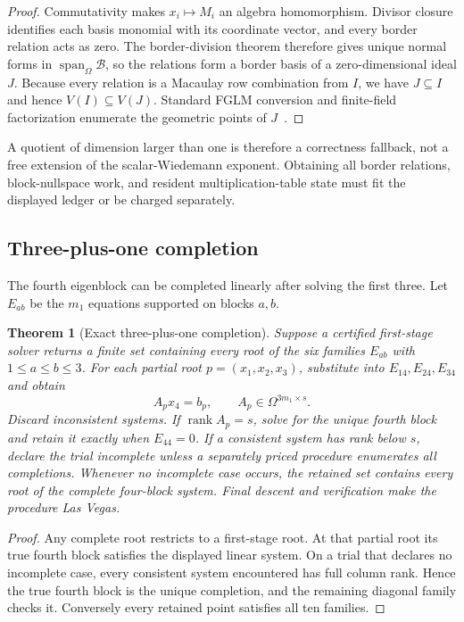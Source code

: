 \documentclass[11pt]{article}
\newtheorem{theorem}{Theorem}[section]
\newcommand{\rank}{\operatorname{rank}}
\newcommand{\Span}{\operatorname{span}}
\begin{document}
\begin{proof}
Commutativity makes $x_i\mapsto M_i$ an algebra homomorphism.  Divisor closure
identifies each basis monomial with its coordinate vector, and every border
relation acts as zero.  The border-division theorem therefore gives unique
normal forms in $\Span_\Omega\mathcal B$, so the relations form a border basis
of a zero-dimensional ideal $J$.  Because every relation is a Macaulay row
combination from $I$, we have $J\subseteq I$ and hence
$V(I)\subseteq V(J)$.  Standard FGLM conversion and finite-field
factorization enumerate the geometric points of $J$~\cite{FGLM1993,KehreinKreuzer2005}.
\end{proof}

A quotient of dimension larger than one is therefore a correctness fallback,
not a free extension of the scalar-Wiedemann exponent.  Obtaining all border
relations, block-nullspace work, and resident multiplication-table state must
fit the displayed ledger or be charged separately.

\subsection{Three-plus-one completion}
The fourth eigenblock can be completed linearly after solving the first three.
Let $E_{ab}$ be the $m_1$ equations supported on blocks $a,b$.

\begin{theorem}[Exact three-plus-one completion]
\label{thm:three-plus-one}
Suppose a certified first-stage solver returns a finite set containing every
root of the six families $E_{ab}$ with $1\le a\le b\le3$.  For each partial
root $p=(x_1,x_2,x_3)$, substitute into $E_{14},E_{24},E_{34}$ and obtain
\[
  A_px_4=b_p,
  \qquad A_p\in\Omega^{3m_1\times s}.
\]
Discard inconsistent systems.  If $\rank A_p=s$, solve for the unique fourth
block and retain it exactly when $E_{44}=0$.  If a consistent system has rank
below $s$, declare the trial incomplete unless a separately priced procedure
enumerates all completions.  Whenever no incomplete case occurs, the retained
set contains every root of the complete four-block system.  Final descent and
verification make the procedure Las Vegas.
\end{theorem}

\begin{proof}
Any complete root restricts to a first-stage root.  At that partial root its
true fourth block satisfies the displayed linear system.  On a trial that declares no incomplete case, every consistent system
encountered has full column rank.  Hence the true fourth block is the unique
completion, and the remaining diagonal family checks it.  Conversely every
retained point satisfies all ten families.
\end{proof}
\end{document}
